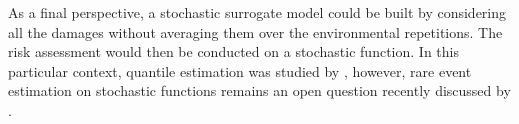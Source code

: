 As a final perspective, a stochastic surrogate model could be built by considering all the damages without averaging them over the environmental repetitions. 
The risk assessment would then be conducted on a stochastic function. 
In this particular context, quantile estimation was studied by \cite{browne_2016_stochastic_quantile}, however, rare event estimation on stochastic functions remains an open question recently discussed by \citet{pires_2023_noisy_RA}. 
